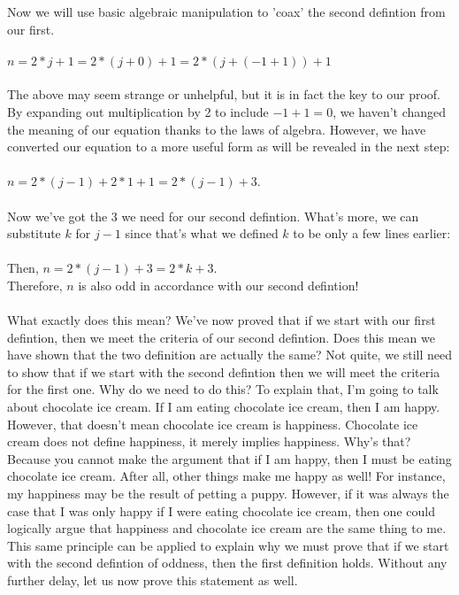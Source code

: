 \documentclass[a4paper,12pt]{article}
\begin{document}
Now we will use basic algebraic manipulation to 'coax' the second defintion from our first.\\
\\
$n = 2*j + 1 = 2*(j + 0) + 1 = 2*(j + (-1 + 1)) + 1$\\
\\
The above may seem strange or unhelpful, but it is in fact the key to our proof. By expanding out multiplication by 2 to include $-1 + 1 = 0$, we haven't changed the meaning of our equation thanks to the laws of algebra. However, we have converted our equation to a more useful form as will be revealed in the next step:\\
\\
$n = 2*(j - 1) + 2*1 + 1 = 2*(j - 1) + 3$.\\
\\
Now we've got the $3$ we need for our second defintion. What's more, we can substitute $k$ for $j - 1$ since that's what we defined $k$ to be only a few lines earlier:\\
\\
Then, $n = 2*(j - 1) + 3 = 2*k + 3$.\\
Therefore, $n$ is also odd in accordance with our second defintion!\\
\\
What exactly does this mean? We've now proved that if we start with our first defintion, then we meet the criteria of our second defintion. Does this mean we have shown that the two definition are actually the same? Not quite, we still need to show that if we start with the second defintion then we will meet the criteria for the first one. Why do we need to do this? To explain that, I'm going to talk about chocolate ice cream. If I am eating chocolate ice cream, then I am happy. However, that doesn't mean chocolate ice cream is happiness. Chocolate ice cream does not define happiness, it merely implies happiness. Why's that? Because you cannot make the argument that if I am happy, then I must be eating chocolate ice cream. After all, other things make me happy as well! For instance, my happiness may be the result of petting a puppy. However, if it was always the case that I was only happy if I were eating chocolate ice cream, then one could logically argue that happiness and chocolate ice cream are the same thing to me. This same principle can be applied to explain why we must prove that if we start with the second defintion of oddness, then the first definition holds. Without any further delay, let us now prove this statement as well.\\
\end{document}
